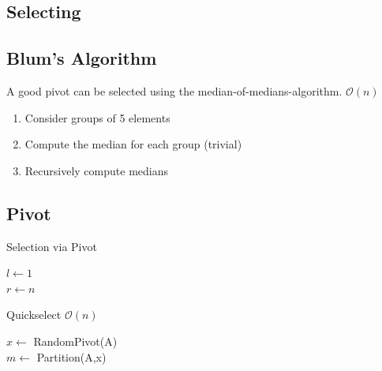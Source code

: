 \documentclass[9pt,landscape,a4paper, table]{extarticle}
\begin{document}
\begin{multicols*}{3}
\section{Selecting}

\subsection{Blum's Algorithm}
A good pivot can be selected using the median-of-medians-algorithm. $\mathcal{O}(n)$

\begin{enumerate}
    \item Consider groups of 5 elements
    \item Compute the median for each group (trivial)
    \item Recursively compute medians
\end{enumerate}

\subsection{Pivot}
{\scriptsize
\begin{algorithm}[H]
    \caption{Selection via Pivot}
    
    \SetAlgoLined
    $l \leftarrow 1$\\
    $r \leftarrow n$
\end{algorithm}}

{\scriptsize
\begin{algorithm}[H]
    \caption{Quickselect $\mathcal{O}(n)$}
    
    \SetAlgoLined
    $x \leftarrow$ RandomPivot(A)\\
    $m \leftarrow$ Partition(A,x)\\
\end{algorithm}}


\end{multicols*}
\end{document}
